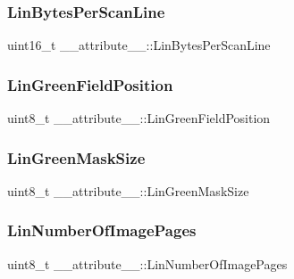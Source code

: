 \subsubsection{\texorpdfstring{Lin\+Bytes\+Per\+Scan\+Line}{LinBytesPerScanLine}}
{\footnotesize\ttfamily uint16\+\_\+t \+\_\+\+\_\+attribute\+\_\+\+\_\+\+::\+Lin\+Bytes\+Per\+Scan\+Line}

\hypertarget{struct____attribute_____a5571b1959950d520f2b45bb5549994e3}{}\label{struct____attribute_____a5571b1959950d520f2b45bb5549994e3} 
\subsubsection{\texorpdfstring{Lin\+Green\+Field\+Position}{LinGreenFieldPosition}}
{\footnotesize\ttfamily uint8\+\_\+t \+\_\+\+\_\+attribute\+\_\+\+\_\+\+::\+Lin\+Green\+Field\+Position}

\hypertarget{struct____attribute_____a5768a84391f8a26d8a9bfd6a22d5e49d}{}\label{struct____attribute_____a5768a84391f8a26d8a9bfd6a22d5e49d} 
\subsubsection{\texorpdfstring{Lin\+Green\+Mask\+Size}{LinGreenMaskSize}}
{\footnotesize\ttfamily uint8\+\_\+t \+\_\+\+\_\+attribute\+\_\+\+\_\+\+::\+Lin\+Green\+Mask\+Size}

\hypertarget{struct____attribute_____af9ba0d9902f5336bd9d044a9dee2ba42}{}\label{struct____attribute_____af9ba0d9902f5336bd9d044a9dee2ba42} 
\subsubsection{\texorpdfstring{Lin\+Number\+Of\+Image\+Pages}{LinNumberOfImagePages}}
{\footnotesize\ttfamily uint8\+\_\+t \+\_\+\+\_\+attribute\+\_\+\+\_\+\+::\+Lin\+Number\+Of\+Image\+Pages}

